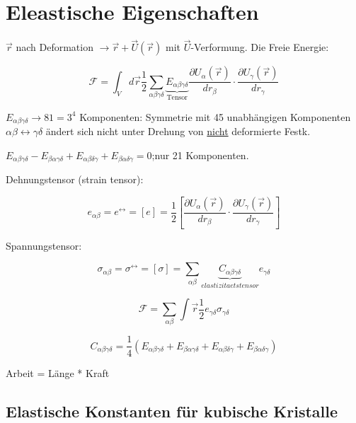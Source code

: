 



\tableofcontents
\setcounter{chapter}{4}
\chapter{Eleastische Eigenschaften}


\(\vec r \) nach Deformation \(\rightarrow \vec r + \vec U(\vec r)\) mit \(\vec U\)-Verformung.
Die Freie Energie:

\[ \mathcal F = \int_V d\vec r \frac 1 2 \sum_{\alpha
  \beta\gamma\delta}\underbrace{E_{\alpha
    \beta\gamma\delta}}_{\text{Tensor}}\frac{\partial U_\alpha(\vec
  r)}{dr_\beta}\cdot
\frac{\partial U_\gamma(\vec r)}{dr_\gamma} \]

\(E_{\alpha\beta\gamma\delta}\rightarrow 81= 3^4 \) Komponenten:
Symmetrie mit 45 unabhängigen Komponenten \(\alpha\beta \leftrightarrow
\gamma\delta\) ändert sich nicht unter Drehung von \underline{nicht}
deformierte Festk.

\(E_{\alpha\beta\gamma\delta}-E_{\beta\alpha\gamma\delta}+E_{\alpha\beta\delta\gamma}+E_{\beta\alpha\delta\gamma}=0\);nur 21 Komponenten.

Dehnungstensor (strain tensor): 

\[e_{\alpha\beta}= e^{\leftrightarrow} = [e] = \frac 1 2 [\frac {\partial U_\alpha(\vec
  r)}{dr_\beta}\cdot \frac{\partial U_\gamma(\vec r)}{dr_\gamma}] 
\]

Spannungstensor: 

\[ \sigma_{\alpha\beta} = \sigma^\leftrightarrow = [\sigma] =
\sum_{\alpha\beta}
\underbrace{C_{\alpha\beta\gamma\delta}}_{elastizitaetstensor}e_{\gamma\delta} \]

\[ \mathcal F = \sum_{\alpha\beta}\int \vec r \frac 1 2
e_{\gamma\delta} \sigma_{\gamma\delta}\]

\[ C_{\alpha\beta\gamma\delta} = \frac 1
4(E_{\alpha\beta\gamma\delta}+E_{\beta\alpha\gamma\delta}+E_{\alpha\beta\delta\gamma}+E_{\beta\alpha\delta\gamma}) 
\]

Arbeit = Länge * Kraft

\section{Elastische Konstanten für kubische Kristalle}

